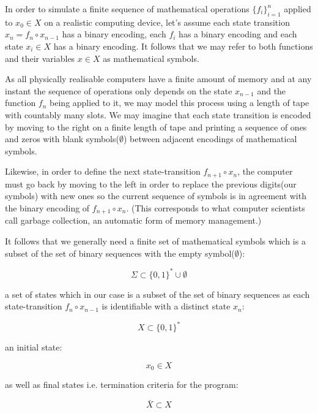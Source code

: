 \documentclass{article}
\begin{document}
In order to simulate a finite sequence of mathematical operations $\{f_i\}_{i=1}^n$ applied to $x_0 \in X$
on a realistic computing device, let's assume each state transition $x_n = f_n \circ x_{n-1}$ has a binary encoding, each $f_i$ has a binary encoding and each state $x_i \in X$ has a binary encoding. It follows that we may refer to both functions and their variables $x \in X$ as mathematical symbols.

As all physically realisable computers have a finite amount of memory and at any instant the sequence of operations only
depends on the state $x_{n-1}$ and the function $f_n$ being applied to it, we may model this process using a length of tape with countably many slots. We may imagine that each state transition is encoded by moving to the right on a finite length of tape and printing a sequence of ones and zeros with blank symbols($\emptyset$) between adjacent encodings of mathematical symbols.

Likewise, in order to define the next state-transition $f_{n+1} \circ x_n$, the computer must go back by moving to the left in order to replace the previous digits(our symbols) with new ones so the current sequence of symbols is in agreement with the binary encoding of $f_{n+1} \circ x_n$. (This corresponds to what computer scientists call garbage collection, an automatic form of memory management.)

It follows that we generally need a finite set of mathematical symbols which is a subset of the set of binary sequences
with the empty symbol($\emptyset$):

\begin{equation}
\Sigma \subset \{0,1\}^* \cup \emptyset
\end{equation}

a set of states which in our case is a subset of the set of binary sequences as each state-transition $f_n \circ x_{n-1}$
is identifiable with a distinct state $x_n$:

\begin{equation}
X \subset \{0,1\}^*
\end{equation}

an initial state:

\begin{equation}
x_0 \in X
\end{equation}

as well as final states i.e. termination criteria for the program:

\begin{equation}
\bar{X} \subset X
\end{equation}
\end{document}
